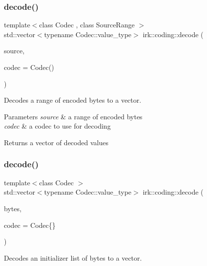 \subsubsection{\texorpdfstring{decode()}{decode()}\hspace{0.1cm}{\footnotesize\ttfamily [2/3]}}
{\footnotesize\ttfamily template$<$class Codec , class Source\+Range $>$ \\
std\+::vector$<$typename Codec\+::value\+\_\+type$>$ irk\+::coding\+::decode (\begin{DoxyParamCaption}\item[{const Source\+Range \&}]{source,  }\item[{const Codec \&}]{codec = {\ttfamily Codec()} }\end{DoxyParamCaption})}



Decodes a range of encoded bytes to a vector. 


\begin{DoxyParams}{Parameters}
{\em source} & a range of encoded bytes \\
\hline
{\em codec} & a codec to use for decoding \\
\hline
\end{DoxyParams}
\begin{DoxyReturn}{Returns}
a vector of decoded values 
\end{DoxyReturn}
\mbox{\label{namespaceirk_1_1coding_abb7007b10914de62d5b89cd28b13d67e}} 
\subsubsection{\texorpdfstring{decode()}{decode()}\hspace{0.1cm}{\footnotesize\ttfamily [3/3]}}
{\footnotesize\ttfamily template$<$class Codec $>$ \\
std\+::vector$<$typename Codec\+::value\+\_\+type$>$ irk\+::coding\+::decode (\begin{DoxyParamCaption}\item[{std\+::initializer\+\_\+list$<$ char $>$}]{bytes,  }\item[{const Codec \&}]{codec = {\ttfamily Codec\{\}} }\end{DoxyParamCaption})}



Decodes an initializer list of bytes to a vector. 


